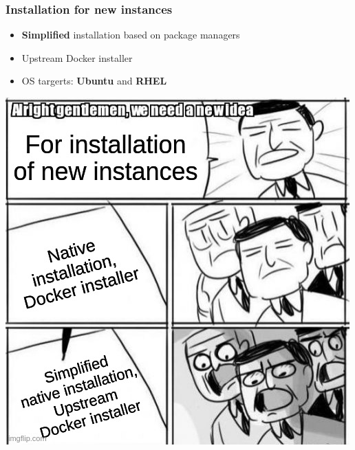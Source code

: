 \begin{frame}
    \frametitle{Installation for new instances}
    \begin{minipage}{0.52\textwidth}
        \begin{itemize}
            \item \textbf{Simplified} installation based on package managers
            \item Upstream Docker installer
            \item OS targerts: \textbf{Ubuntu} and \textbf{RHEL}
        \end{itemize}
    \end{minipage}%
    \begin{minipage}{0.48\textwidth}
        \begin{center}
            \includegraphics[width=0.99\linewidth]{pictures/new-installation.jpeg}
        \end{center}
    \end{minipage}
\end{frame}

